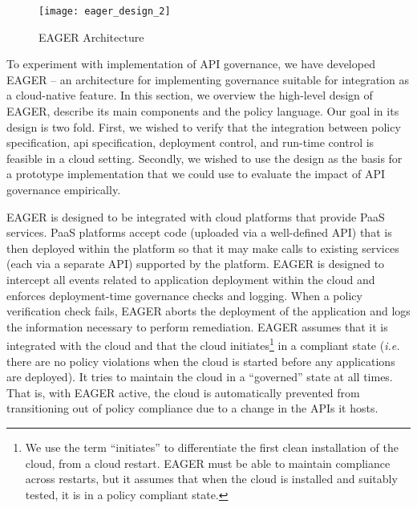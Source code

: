 \begin{figure*}[t]
\centering
\texttt{[image: eager\_design\_2]}
\caption{EAGER Architecture
\label{fig:eager_design}
}
\end{figure*}

To experiment with implementation of API governance, we have developed EAGER
-- an architecture for implementing governance suitable for integration
as a cloud-native feature.
In this section, we
overview the high-level design of EAGER, describe its main
components and the policy language.  Our goal in its design is two fold.
First, we wished to verify that the integration between policy specification,
api specification,
deployment control, and run-time control is feasible in a cloud setting.
Secondly, we wished to use the design as the basis for a prototype
implementation that we could use to evaluate the impact of API governance
empirically.

EAGER is designed to be integrated with cloud platforms that provide PaaS services. 
PaaS platforms accept code (uploaded via a well-defined API) that is then
deployed within the platform so that it may make calls to existing services
(each via a separate API) supported by the platform.
EAGER is designed to intercept all events related to application 
deployment within the cloud
and enforces deployment-time governance checks and
logging. 
When a policy verification check fails, 
EAGER aborts the deployment of the application and logs the information
necessary to perform remediation.  EAGER assumes that it is integrated with
the cloud and that the cloud initiates\footnote{We use the term
``initiates'' to differentiate the first clean installation of the cloud, from
a cloud restart.  EAGER must be able to maintain compliance across restarts,
but it assumes that when the cloud is installed and suitably tested, it is in
a policy compliant state.} 
in a compliant state ({\em i.e.} there are
no policy violations when the cloud is started before any applications are
deployed).  It tries to maintain the cloud
in a ``governed'' state at all times.  That is, with EAGER active, the cloud
is
automatically prevented from transitioning out of policy compliance due to a
change in the APIs it hosts.

